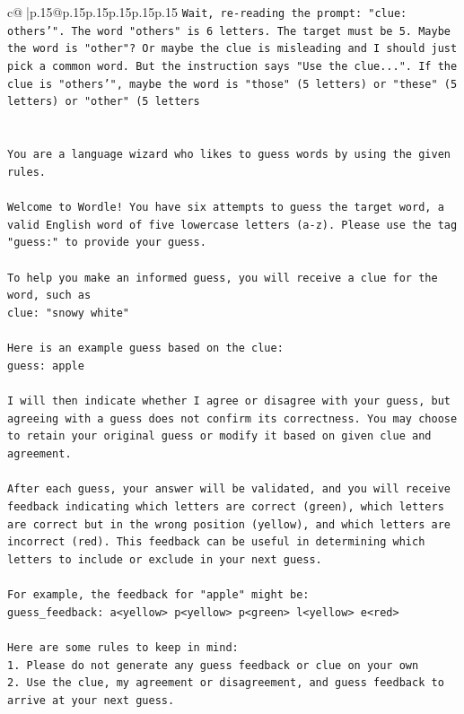 \documentclass{article}
\begin{document}
{\begin{supertabular}{c@{$\;$}|p{.15\linewidth}@{}p{.15\linewidth}p{.15\linewidth}p{.15\linewidth}p{.15\linewidth}p{.15\linewidth}}
{{{\texttt{Wait, re{-}reading the prompt: "clue: others'". The word "others" is 6 letters. The target must be 5. Maybe the word is "other"? Or maybe the clue is misleading and I should just pick a common word. But the instruction says "Use the clue...". If the clue is "others'", maybe the word is "those" (5 letters) or "these" (5 letters) or "other" (5 letters} \\
\\ 
\\ 
\texttt{You are a language wizard who likes to guess words by using the given rules.} \\
\\ 
\texttt{Welcome to Wordle! You have six attempts to guess the target word, a valid English word of five lowercase letters (a{-}z). Please use the tag "guess:" to provide your guess.} \\
\\ 
\texttt{To help you make an informed guess, you will receive a clue for the word, such as} \\
\texttt{clue: "snowy white"} \\
\\ 
\texttt{Here is an example guess based on the clue: } \\
\texttt{guess: apple} \\
\\ 
\texttt{I will then indicate whether I agree or disagree with your guess, but agreeing with a guess does not confirm its correctness. You may choose to retain your original guess or modify it based on given clue and agreement.} \\
\\ 
\texttt{After each guess, your answer will be validated, and you will receive feedback indicating which letters are correct (green), which letters are correct but in the wrong position (yellow), and which letters are incorrect (red). This feedback can be useful in determining which letters to include or exclude in your next guess.} \\
\\ 
\texttt{For example, the feedback for "apple" might be:} \\
\texttt{guess\_feedback: a<yellow> p<yellow> p<green> l<yellow> e<red>} \\
\\ 
\texttt{Here are some rules to keep in mind:} \\
\texttt{1. Please do not generate any guess feedback or clue on your own} \\
\texttt{2. Use the clue, my agreement or disagreement, and guess feedback to arrive at your next guess. } \\
}}}
\end{supertabular}}
\end{document}
